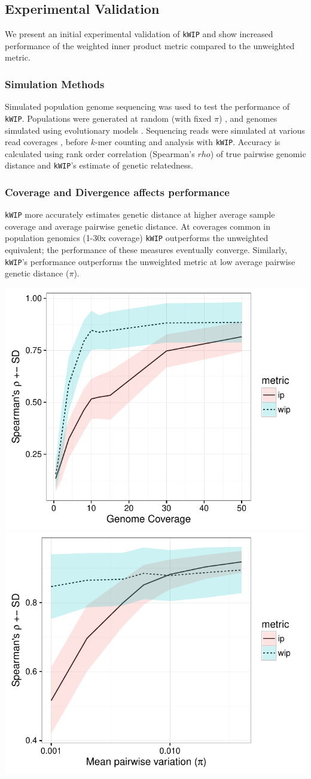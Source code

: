 \documentclass[a0,portrait]{a0poster}
\begin{document}
\begin{multicols}{2}

\section*{Experimental Validation}

We present an initial experimental validation of \texttt{kWIP} and show
increased performance of the weighted inner product metric compared to the
unweighted metric.

\subsubsection*{Simulation Methods}

Simulated population genome sequencing was used to test the performance of
\texttt{kWIP}. Populations were generated at random \autocite{staab_scrm:_2015}
(with fixed $\pi$) , and genomes simulated using evolutionary models
\autocite{cartwright_dna_2005}. Sequencing reads were simulated at various
read coverages \autocite{holtgrewe_mason_2010}, before $k$-mer counting
\autocite{crusoe_khmer_2015} and analysis with \texttt{kWIP}.  Accuracy is
calculated using rank order correlation (Spearman's $rho$) of true pairwise
genomic distance and \texttt{kWIP}'s estimate of genetic relatedness.

\subsubsection*{Coverage and Divergence affects performance}

\texttt{kWIP} more accurately estimates genetic distance at higher average
sample coverage and average pairwise genetic distance. At coverages common in
population genomics (1-30x coverage) \texttt{kWIP} outperforms the unweighted
equivalent; the performance of these measures eventually converge. Similarly,
\texttt{kWIP}'s performance outperforms the unweighted metric at low average
pairwise genetic distance ($\pi$).

\begin{center}
  \includegraphics[width=0.35\linewidth]{coverage-vs-rho_50x.pdf}
  \includegraphics[width=0.35\linewidth]{pi-vs-performance.pdf}
\end{center}


\end{multicols}
\end{document}
